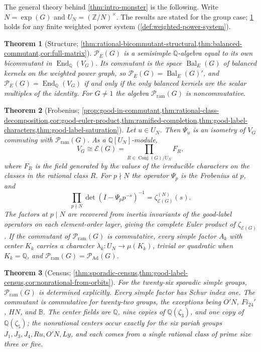 \documentclass[11pt,reqno]{amsart}
\numberwithin{equation}{section}
\theoremstyle{remark}
\theoremstyle{plain}
\newtheorem{thmintro}{Theorem}
\newcommand{\Q}{\mathbb Q}
\newcommand{\Z}{\mathbb Z}
\newcommand{\B}{\mathbb B}
\newcommand{\PE}{\mathcal P_E}
\newcommand{\Pram}{\mathcal P_{\mathrm{ram}}}
\newcommand{\PAd}{\mathcal P_{\mathrm{Ad}}}
\newcommand{\End}{\operatorname{End}}
\newcommand{\Bal}{\operatorname{Bal}}
\newcommand{\Conj}{\operatorname{Conj}}
\newcommand{\1}{\mathbf 1}
\begin{document}
The general theory behind \cref{thm:intro-monster} is the following.  Write
\(N=\exp(G)\) and \(U_N=(\Z/N)^\times\).  The results are stated for the
group case; \cref{thm:intro-structure} holds for any finite weighted power
system (\cref{def:weighted-power-system}).

\begin{thmintro}[Structure; \cref{thm:rational-bicommutant-structural,thm:balanced-commutant,cor:full-matrix}]
\label{thm:intro-structure}
\(\PE(G)\) is a semisimple \(\Q\)-algebra equal to its own bicommutant in
\(\End_\Q(V_G)\).  Its commutant is the space \(\Bal_E(G)\) of balanced
kernels on the weighted power graph, so \(\PE(G)=\Bal_E(G)'\), and
\(\PE(G)=\End_\Q(V_G)\) if and only if the only balanced kernels are the
scalar multiples of the identity.  For \(G\neq1\) the algebra
\(\Pram(G)\) is noncommutative.
\end{thmintro}

\begin{thmintro}[Frobenius; \cref{prop:good-in-commutant,thm:rational-class-decomposition,cor:good-euler-product,thm:ramified-completion,thm:good-label-characters,thm:good-label-saturation}]
\label{thm:intro-frobenius}
Let \(u\in U_N\).  Then \(\Psi_u\) is an isometry of \(V_G\) commuting
with \(\Pram(G)\).  As a \(\Q[U_N]\)-module,
\[
 V_G\cong\mathcal E(G)=\prod_{R\in\Conj(G)/U_N}F_R,
\]
where \(F_R\) is the field generated by the values of the irreducible
characters on the classes in the rational class \(R\).  For \(p\nmid N\)
the operator \(\Psi_p\) is the Frobenius at \(p\), and
\[
 \prod_{p\nmid N}\det(I-\Psi_pp^{-s})^{-1}
 =\zeta^{(N)}_{\mathcal E(G)}(s).
\]
The factors at \(p\mid N\) are recovered from inertia invariants of the
good-label operators on each element-order layer, giving the complete
Euler product of \(\zeta_{\mathcal E(G)}\).  If the commutant of
\(\Pram(G)\) is commutative, every simple factor \(A_k\) with center
\(K_k\) carries a character \(\lambda_k:U_N\to\mu(K_k)\), trivial or
quadratic when \(K_k=\Q\), and \(\Pram(G)=\PAd(G)\).
\end{thmintro}

\begin{thmintro}[Census; \cref{thm:sporadic-census,thm:good-label-census,cor:nonrational-from-orbits}]
\label{thm:intro-census}
For the twenty-six sporadic simple groups, \(\Pram(G)\) is determined
explicitly.  Every simple factor has Schur index one.  The commutant is
commutative for twenty-two groups, the exceptions being \(O'N\),
\(Fi_{24}'\), \(HN\), and \(\B\).  The center fields are \(\Q\), nine
copies of \(\Q(\zeta_3)\), and one copy of \(\Q(\zeta_5)\); the
nonrational centers occur exactly for the six pariah groups
\(J_1,J_3,J_4,Ru,O'N,Ly\), and each comes from a single rational class of
prime size three or five.
\end{thmintro}
\end{document}
